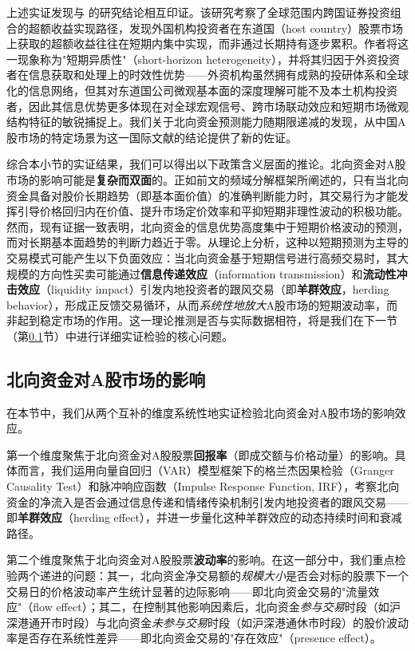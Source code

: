 \documentclass{article}
\begin{document}
上述实证发现与 \textcite{doi:10.1080/1540496X.2015.1011531} 的研究结论相互印证。该研究考察了全球范围内跨国证券投资组合的超额收益实现路径，发现外国机构投资者在东道国（host country）股票市场上获取的超额收益往往在短期内集中实现，而非通过长期持有逐步累积。作者将这一现象称为"短期异质性"（short-horizon heterogeneity），并将其归因于外资投资者在信息获取和处理上的时效性优势——外资机构虽然拥有成熟的投研体系和全球化的信息网络，但其对东道国公司微观基本面的深度理解可能不及本土机构投资者，因此其信息优势更多体现在对全球宏观信号、跨市场联动效应和短期市场微观结构特征的敏锐捕捉上。我们关于北向资金预测能力随期限递减的发现，从中国A股市场的特定场景为这一国际文献的结论提供了新的佐证。

综合本小节的实证结果，我们可以得出以下政策含义层面的推论。北向资金对A股市场的影响可能是\textbf{复杂而双面}的。正如前文的频域分解框架所阐述的，只有当北向资金具备对股价长期趋势（即基本面价值）的准确判断能力时，其交易行为才能发挥引导价格回归内在价值、提升市场定价效率和平抑短期非理性波动的积极功能。然而，现有证据一致表明，北向资金的信息优势高度集中于短期价格波动的预测，而对长期基本面趋势的判断力趋近于零。从理论上分析，这种以短期预测为主导的交易模式可能产生以下负面效应：当北向资金基于短期信号进行高频交易时，其大规模的方向性买卖可能通过\textbf{信息传递效应}（information transmission）和\textbf{流动性冲击效应}（liquidity impact）引发内地投资者的跟风交易（即\textbf{羊群效应}，herding behavior），形成正反馈交易循环，从而\textit{系统性地放大}A股市场的短期波动率，而非起到稳定市场的作用。这一理论推测是否与实际数据相符，将是我们在下一节（第\ref{sec:impact}节）中进行详细实证检验的核心问题。

\subsection{北向资金对A股市场的影响}
\label{sec:impact}

在本节中，我们从两个互补的维度系统性地实证检验北向资金对A股市场的影响效应。

第一个维度聚焦于北向资金对A股股票\textbf{回报率}（即成交额与价格动量）的影响。具体而言，我们运用向量自回归（VAR）模型框架下的格兰杰因果检验（Granger Causality Test）和脉冲响应函数（Impulse Response Function, IRF），考察北向资金的净流入是否会通过信息传递和情绪传染机制引发内地投资者的跟风交易——即\textbf{羊群效应}（herding effect），并进一步量化这种羊群效应的动态持续时间和衰减路径。

第二个维度聚焦于北向资金对A股股票\textbf{波动率}的影响。在这一部分中，我们重点检验两个递进的问题：其一，北向资金净交易额的\textit{规模大小}是否会对标的股票下一个交易日的价格波动率产生统计显著的边际影响——即北向资金交易的"流量效应"（flow effect）；其二，在控制其他影响因素后，北向资金\textit{参与交易}时段（如沪深港通开市时段）与北向资金\textit{未参与交易}时段（如沪深港通休市时段）的股价波动率是否存在系统性差异——即北向资金交易的"存在效应"（presence effect）。
\end{document}
